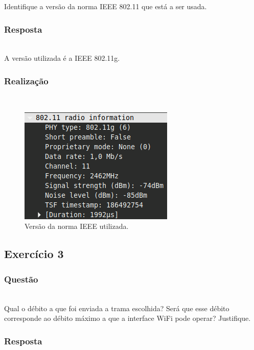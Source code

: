 \documentclass{llncs}
\begin{document}
Identifique a versão da norma IEEE 802.11 que está a ser usada.

\subsubsection{Resposta}\rule[-10pt]{0pt}{10pt}\\

A versão utilizada é a IEEE 802.11g.

\subsubsection{Realização}\rule[-10pt]{0pt}{10pt}\\

\begin{figure}
  \begin{center}
  \includegraphics[scale=0.35]{./imagens/ex2.png} 
  \end{center}
  \caption{Versão da norma IEEE utilizada.}
  \label{fig:norma_ieee}
\end{figure}


\clearpage
\subsection{Exercício 3}
\subsubsection{Questão}\rule[-10pt]{0pt}{10pt}\\

Qual o débito a que foi enviada a trama escolhida? Será que esse débito corresponde ao débito máximo a que a interface WiFi pode operar? Justifique.

\subsubsection{Resposta}\rule[-10pt]{0pt}{10pt}\\
\end{document}
